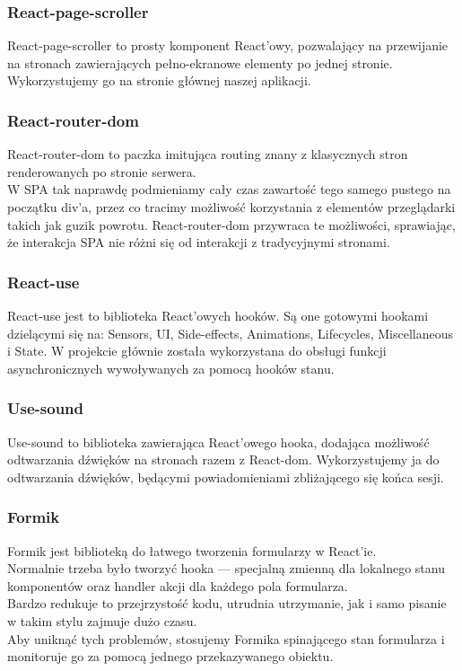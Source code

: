 \documentclass[a4paper,11pt]{report}
\begin{document}
\subsubsection{React-page-scroller}
React-page-scroller\cite{react-page-scroller} to prosty komponent React'owy,
 pozwalający na przewijanie na stronach zawierających pełno-ekranowe elementy po jednej stronie.
 Wykorzystujemy go na stronie głównej naszej aplikacji.\\

\subsubsection{React-router-dom}
React-router-dom\cite{react-router-dom} to paczka imitująca routing znany z klasycznych stron renderowanych po stronie serwera.\\
W SPA tak naprawdę podmieniamy cały czas zawartość tego samego pustego na początku div'a,
 przez co tracimy możliwość korzystania z elementów przeglądarki takich jak guzik powrotu.
React-router-dom przywraca te możliwości, sprawiając, że interakcja SPA nie różni się od interakcji z tradycyjnymi stronami.

\subsubsection{React-use}
React-use\cite{react-use} jest to biblioteka React'owych hooków.
 Są one gotowymi hookami dzielącymi się na: Sensors, UI, Side-effects,
 Animations, Lifecycles, Miscellaneous i State. 
 W projekcie głównie została wykorzystana do obsługi funkcji asynchronicznych wywoływanych za pomocą hooków stanu. \\  

\subsubsection{Use-sound}
Use-sound\cite{use-sound} to biblioteka zawierająca React'owego hooka,
 dodająca możliwość odtwarzania dźwięków na stronach razem z React-dom.
 Wykorzystujemy ja do odtwarzania dźwięków, będącymi powiadomieniami zbliżającego się końca sesji.\\ 

\subsubsection{Formik}
Formik\cite{formik} jest biblioteką do łatwego tworzenia formularzy w React'ie.\\
 Normalnie trzeba było tworzyć hooka — specjalną zmienną dla lokalnego stanu komponentów oraz handler akcji dla każdego pola formularza.\\
 Bardzo redukuje to przejrzystość kodu, utrudnia utrzymanie, jak i samo pisanie w takim stylu zajmuje dużo czasu.\\
 Aby uniknąć tych problemów, stosujemy Formika spinającego stan formularza i monitoruje go za pomocą jednego przekazywanego obiektu.
\end{document}
